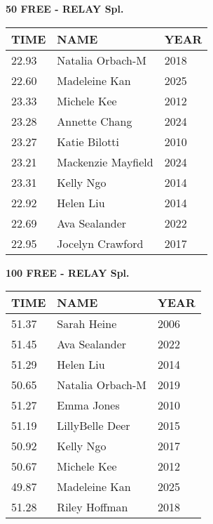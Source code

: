 \begin{center}
\begin{minipage}[t]{0.7\textwidth}
\centering
\textbf{50 FREE - RELAY Spl.}\\[0.05cm]
\begin{tabular}{@{}p{1.8cm}p{2.8cm}p{1.2cm}@{}}
\hline
\textbf{TIME} & \textbf{NAME} & \textbf{YEAR} \\
\hline
22.93 & Natalia Orbach-M & 2018 \\
22.60 & Madeleine Kan & 2025 \\
23.33 & Michele Kee & 2012 \\
23.28 & Annette Chang & 2024 \\
23.27 & Katie Bilotti & 2010 \\
23.21 & Mackenzie Mayfield & 2024 \\
23.31 & Kelly Ngo & 2014 \\
22.92 & Helen Liu & 2014 \\
22.69 & Ava Sealander & 2022 \\
22.95 & Jocelyn Crawford & 2017 \\
\hline
\end{tabular}
\end{minipage}
\end{center}

\vspace{0.4cm}

\begin{center}
\begin{minipage}[t]{0.7\textwidth}
\centering
\textbf{100 FREE - RELAY Spl.}\\[0.05cm]
\begin{tabular}{@{}p{1.8cm}p{2.8cm}p{1.2cm}@{}}
\hline
\textbf{TIME} & \textbf{NAME} & \textbf{YEAR} \\
\hline
51.37 & Sarah Heine & 2006 \\
51.45 & Ava Sealander & 2022 \\
51.29 & Helen Liu & 2014 \\
50.65 & Natalia Orbach-M & 2019 \\
51.27 & Emma Jones & 2010 \\
51.19 & LillyBelle Deer & 2015 \\
50.92 & Kelly Ngo & 2017 \\
50.67 & Michele Kee & 2012 \\
49.87 & Madeleine Kan & 2025 \\
51.28 & Riley Hoffman & 2018 \\
\hline
\end{tabular}
\end{minipage}
\end{center}

